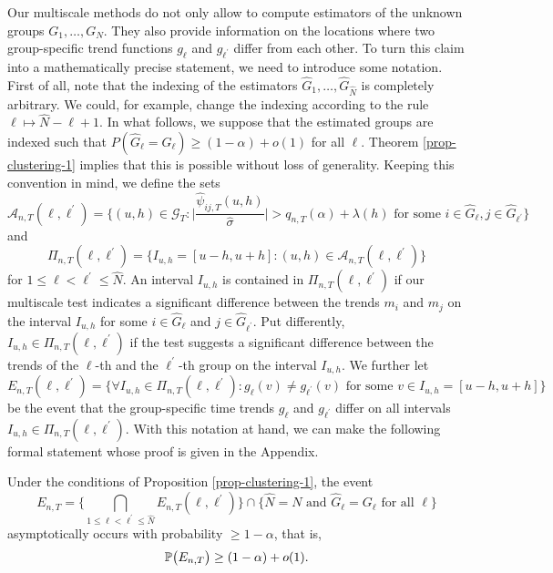 Our multiscale methods do not only allow to compute estimators of the unknown groups $G_1,\ldots,G_N$. They also provide information on the locations where two group-specific trend functions $g_\ell$ and $g_{\ell^\prime}$ differ from each other. To turn this claim into a mathematically precise statement, we need to introduce some notation. First of all, note that the indexing of the estimators $\widehat{G}_1,\ldots,\widehat{G}_{\widehat{N}}$ is completely arbitrary. We could, for example, change the indexing according to the rule $\ell \mapsto \widehat{N} - \ell + 1$. In what follows, we suppose that the estimated groups are indexed such that $P( \widehat{G}_\ell = G_\ell) \ge (1-\alpha) + o(1)$ for all $\ell$. Theorem \ref{prop-clustering-1} implies that this is possible without loss of generality. Keeping this convention in mind, we define the sets 
\[ \mathcal{A}_{n,T}(\ell,\ell^\prime) = \Big\{ (u,h) \in \mathcal{G}_T: \Big| \frac{\widehat{\psi}_{ij,T}(u,h)}{\widehat{\sigma}} \Big| > q_{n,T}(\alpha) + \lambda(h) \text{ for some } i \in \widehat{G}_\ell, j \in \widehat{G}_{\ell^\prime} \Big\} \] 
and  
\[ \Pi_{n,T}(\ell,\ell^\prime) = \big\{ I_{u,h} = [u-h,u+h]: (u,h) \in \mathcal{A}_{n,T}(\ell,\ell^\prime) \big\} \]
for $1 \le \ell < \ell^\prime \le \widehat{N}$. An interval $I_{u,h}$ is contained in $\Pi_{n,T}(\ell,\ell^\prime)$ if our multiscale test indicates a significant difference between the trends $m_i$ and $m_j$ on the interval $I_{u,h}$ for some $i \in \widehat{G}_\ell$ and $j \in \widehat{G}_{\ell^\prime}$. Put differently,  $I_{u,h} \in \Pi_{n,T}(\ell,\ell^\prime)$ if the test suggests a significant difference between the trends of the $\ell$-th and the $\ell^\prime$-th group on the interval $I_{u,h}$. We further let
\[ E_{n,T}(\ell,\ell^\prime) = \Big\{ \forall I_{u,h} \in \Pi_{n,T}(\ell,\ell^\prime): g_\ell(v) \ne g_{\ell^\prime}(v) \text{ for some } v \in I_{u,h} = [u-h,u+h] \Big\} \]
be the event that the group-specific time trends $g_\ell$ and $g_{\ell^\prime}$ differ on all intervals $I_{u,h} \in \Pi_{n,T}(\ell,\ell^\prime)$. With this notation at hand, we can make the following formal statement whose proof is given in the Appendix.
\begin{prop}\label{prop-clustering-2}
Under the conditions of Proposition \ref{prop-clustering-1}, the event 
\[ E_{n,T} = \Big\{ \bigcap_{1 \le \ell < \ell^\prime \le \widehat{N}} E_{n,T}(\ell,\ell^\prime) \Big\} \cap \Big\{ \widehat{N} = N \text{ and } \widehat{G}_\ell = G_\ell \text{ for all } \ell \Big\} \]
asymptotically occurs with probability $\ge 1-\alpha$, that is, 
\[ \mathbb{P} \big( E_{n,T} \big) \ge (1 - \alpha) + o(1). \]
\end{prop}
